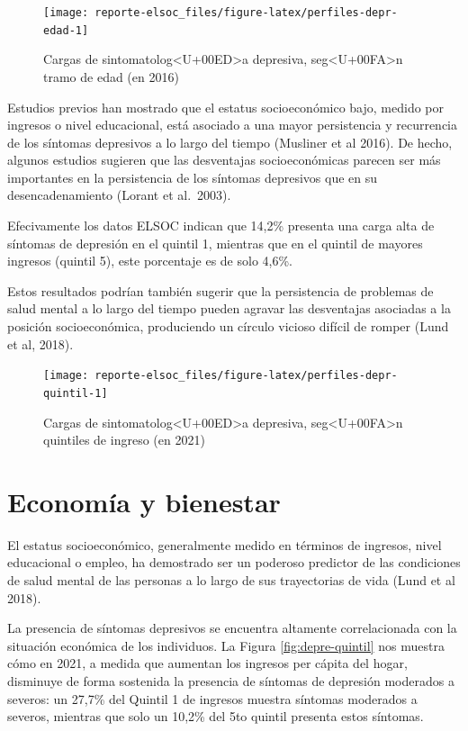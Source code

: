 \documentclass[
  12pt,
]{book}
\begin{document}
\begin{figure}

{\centering \texttt{[image: reporte-elsoc\_files/figure-latex/perfiles-depr-edad-1]} 

}

\caption{Cargas de sintomatolog<U+00ED>a depresiva, seg<U+00FA>n tramo de edad (en 2016)}\label{fig:perfiles-depr-edad}
\end{figure}

Estudios previos han mostrado que el estatus socioeconómico bajo, medido por ingresos o nivel educacional, está asociado a una mayor persistencia y recurrencia de los síntomas depresivos a lo largo del tiempo (Musliner et al 2016). De hecho, algunos estudios sugieren que las desventajas socioeconómicas parecen ser más importantes en la persistencia de los síntomas depresivos que en su desencadenamiento (Lorant et al.~2003).

Efecivamente los datos ELSOC indican que 14,2\% presenta una carga alta de síntomas de depresión en el quintil 1, mientras que en el quintil de mayores ingresos (quintil 5), este porcentaje es de solo 4,6\%.

Estos resultados podrían también sugerir que la persistencia de problemas de salud mental a lo largo del tiempo pueden agravar las desventajas asociadas a la posición socioeconómica, produciendo un círculo vicioso difícil de romper (Lund et al, 2018).

\begin{figure}

{\centering \texttt{[image: reporte-elsoc\_files/figure-latex/perfiles-depr-quintil-1]} 

}

\caption{Cargas de sintomatolog<U+00ED>a depresiva, seg<U+00FA>n quintiles de ingreso (en 2021)}\label{fig:perfiles-depr-quintil}
\end{figure}

\hypertarget{economuxeda-y-bienestar}{%
\section{Economía y bienestar}\label{economuxeda-y-bienestar}}

El estatus socioeconómico, generalmente medido en términos de ingresos, nivel educacional o empleo, ha demostrado ser un poderoso predictor de las condiciones de salud mental de las personas a lo largo de sus trayectorias de vida (Lund et al 2018).

La presencia de síntomas depresivos se encuentra altamente correlacionada con la situación económica de los individuos. La Figura \ref{fig:depre-quintil} nos muestra cómo en 2021, a medida que aumentan los ingresos per cápita del hogar, disminuye de forma sostenida la presencia de síntomas de depresión moderados a severos: un 27,7\% del Quintil 1 de ingresos muestra síntomas moderados a severos, mientras que solo un 10,2\% del 5to quintil presenta estos síntomas.
\end{document}
